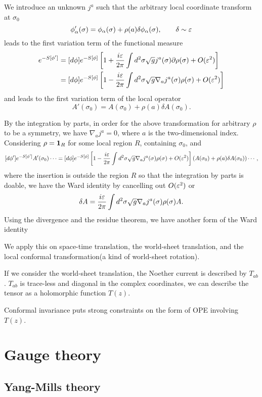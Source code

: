 \documentclass{../../large}
\begin{document}
\begin{prb}
We introduce an unknown $j^a$ such that the arbitrary local coordinate transform at $\sigma_0$
\[\phi'_\alpha(\sigma)=\phi_\alpha(\sigma)+\rho(a)\delta\phi_\alpha(\sigma),\qquad \delta\sim\varepsilon\]
leads to the first variation term of the functional measure
\begin{align*}
[d\phi']e^{-S[\phi']}
&=[d\phi]e^{-S[\phi]}\left[1+\frac{i\e}{2\pi}\int d^2\sigma\sqrt gj^a(\sigma)\partial\rho(\sigma)+O(\e^2)\right]\\
&=[d\phi]e^{-S[\phi]}\left[1-\frac{i\e}{2\pi}\int d^2\sigma\sqrt g\nabla_aj^a(\sigma)\rho(\sigma)+O(\e^2)\right]
\end{align*}
and
leads to the first variation term of the local operator
\[A'(\sigma_0)=A(\sigma_0)+\rho(a)\delta A(\sigma_0).\]

By the integration by parts, in order for the above transformation for arbitrary $\rho$ to be a symmetry, we have $\nabla_aj^a=0$, where $a$ is the two-dimensional index.
Considering $\rho=\mathbf{1}_R$ for some local region $R$, containing $\sigma_0$, and
\[[d\phi']e^{-S[\phi']}A'(\sigma_0)\cdots=[d\phi]e^{-S[\phi]}\left[1-\frac{i\varepsilon}{2\pi}\int d^2\sigma\sqrt g\nabla_aj^a(\sigma)\rho(\sigma)+O(\varepsilon^2)\right](A(\sigma_0)+\rho(a)\delta A(\sigma_0))\cdots,\]
where the insertion is outside the region $R$ so that the integration by parts is doable, we have the Ward identity by cancelling out $O(\varepsilon^2)$ or 
\[\delta A=\frac{i\varepsilon}{2\pi}\int d^2\sigma\sqrt g\nabla_aj^a(\sigma)\rho(\sigma)A.\]
Using the divergence and the residue theorem, we have another form of the Ward identity
\[\]

We apply this on space-time translation, the world-sheet translation, and the local conformal transformation(a kind of world-sheet rotation).

\end{prb}

If we consider the world-sheet translation, the Noether current is described by $T_{ab}$.
$T_{ab}$ is trace-less and diagonal in the complex coordinates, we can describe the tensor as a holomorphic function $T(z)$.

Conformal invariance puts strong constraints on the form of OPE involving $T(z)$.


\part{Gauge theory}

\chapter{Yang-Mills theory}
\end{document}
